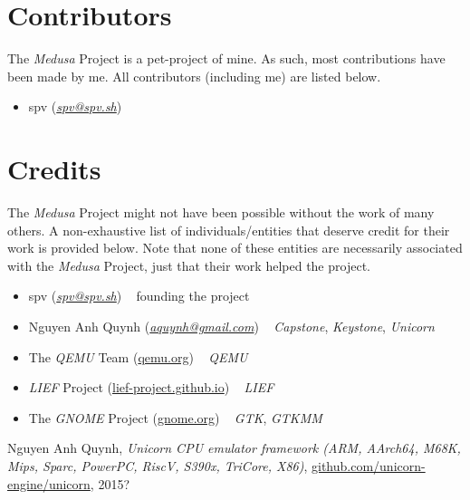 \documentclass{report}
\newcommand{\Medusa}{\textit{Medusa}\xspace}
\begin{document}
	\chapter{Contributors}
	The \Medusa Project is a pet-project of mine. As such, most
	contributions have been made by me. All contributors (including me) are
	listed below.

	\begin{itemize}
		\item spv (\textit{\href{mailto:spv@spv.sh}{spv@spv.sh}})
	\end{itemize}

	\chapter{Credits}
	The \Medusa Project might not have been possible without the work of many
	others. A non-exhaustive list of individuals/entities that deserve credit
	for their work is provided below. Note that none of these entities are
	necessarily associated with the \Medusa Project, just that their work helped
	the project.

	\begin{itemize}
		\item spv (\textit{\href{mailto:spv@spv.sh}{spv@spv.sh}}) ~ founding the
		project

		\item Nguyen Anh Quynh
		(\textit{\href{mailto:aquynh@gmail.com}{aquynh@gmail.com}}) ~
		\textit{Capstone}, \textit{Keystone}, \textit{Unicorn}

		\item The \textit{QEMU} Team (\href{https://www.qemu.org}{qemu.org}) ~
		\textit{QEMU}

		\item \textit{LIEF} Project
		(\href{https://lief-project.github.io/}{lief-project.github.io}) ~
		\textit{LIEF}

		\item The \textit{GNOME} Project
		(\href{https://www.gnome.org}{gnome.org}) ~ \textit{GTK}, \textit{GTKMM}
	\end{itemize}

	\begin{thebibliography}{99}
			Nguyen Anh Quynh,
			\textit{Unicorn CPU emulator framework (ARM, AArch64, M68K, Mips,
			Sparc, PowerPC, RiscV, S390x, TriCore, X86)},
			\href{https://github.com/unicorn-engine/unicorn}
				 {github.com/unicorn-engine/unicorn},
			2015?
	\end{thebibliography}
\end{document}
